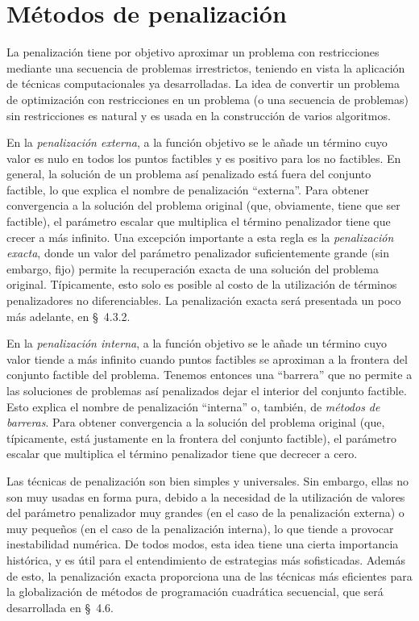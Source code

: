 
\section{Métodos de penalización}\label{v2:sec:4.3}

La penalización tiene por objetivo aproximar un problema con restricciones mediante una secuencia de problemas irrestrictos, teniendo en vista la aplicación de técnicas computacionales ya desarrolladas. La idea de convertir un problema de optimización con restricciones en un problema (o una secuencia de problemas) sin restricciones es natural y es usada en la construcción de varios algoritmos.

En la \textit{penalización externa}, a la función objetivo se le añade un término cuyo valor es nulo en todos los puntos factibles y es positivo para los no factibles. En general, la solución de un problema así penalizado está fuera del conjunto factible, lo que explica el nombre de penalización ``externa''. Para obtener convergencia a la solución del problema original (que, obviamente, tiene que ser factible), el parámetro escalar que multiplica el término penalizador tiene que crecer a más infinito. Una excepción importante a esta regla es la \textit{penalización exacta}, donde un valor del parámetro penalizador suficientemente grande (sin embargo, fijo) permite la recuperación exacta de una solución del problema original. Típicamente, esto solo es posible al costo de la utilización de términos penalizadores no diferenciables. La penalización exacta será presentada un poco más adelante, en \S~4.3.2.

En la \textit{penalización interna}, a la función objetivo se le añade un término cuyo valor tiende a más infinito cuando puntos factibles se aproximan a la frontera del conjunto factible del problema. Tenemos entonces una ``barrera'' que no permite a las soluciones de problemas así penalizados dejar el interior del conjunto factible. Esto explica el nombre de penalización ``interna'' o, también, de \textit{métodos de barreras}. Para obtener convergencia a la solución del problema original (que, típicamente, está justamente en la frontera del conjunto factible), el parámetro escalar que multiplica el término penalizador tiene que decrecer a cero.

Las técnicas de penalización son bien simples y universales. Sin embargo, ellas no son muy usadas en forma pura, debido a la necesidad de la utilización de valores del parámetro penalizador muy grandes (en el caso de la penalización externa) o muy pequeños (en el caso de la penalización interna), lo que tiende a provocar inestabilidad numérica. De todos modos, esta idea tiene una cierta importancia histórica, y es útil para el entendimiento de estrategias más sofisticadas. Además de esto, la penalización exacta proporciona una de las técnicas más eficientes para la globalización de métodos de programación cuadrática secuencial, que será desarrollada en \S~4.6.

